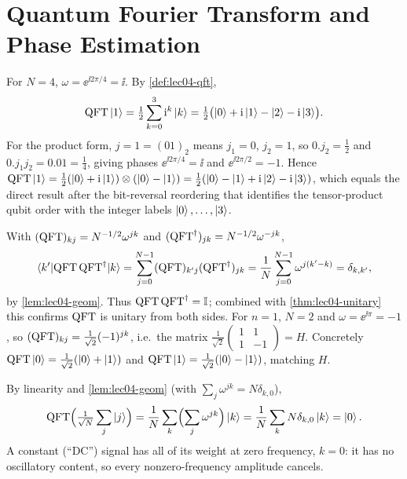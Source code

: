 \chapter{Quantum Fourier Transform and Phase Estimation}

\begin{solution}
For $N=4$, $\omega=\ee^{\ii 2\pi/4}=\ii$. By \cref{def:lec04-qft},
\[
  \mathrm{QFT}\ket{1}=\tfrac12\sum_{k=0}^{3}\mathrm{i}^{k}\ket{k}
   =\tfrac12\bigl(\ket{0}+\mathrm{i}\ket{1}-\ket{2}-\mathrm{i}\ket{3}\bigr).
\]
For the product form, $j=1=(01)_2$ means $j_1=0$, $j_2=1$, so $0.j_2=\tfrac12$
and $0.j_1 j_2=0.01=\tfrac14$, giving phases $\ee^{\ii 2\pi/4}=\ii$ and
$\ee^{\ii 2\pi/2}=-1$. Hence
$\mathrm{QFT}\ket{1}=\tfrac12(\ket{0}+\mathrm{i}\ket{1})\otimes(\ket{0}-\ket{1})
=\tfrac12(\ket{0}-\ket{1}+\mathrm{i}\ket{2}-\mathrm{i}\ket{3})$, which equals the direct
result after the bit-reversal reordering that identifies the tensor-product qubit
order with the integer labels $\ket{0},\dots,\ket{3}$.
\end{solution}

\begin{solution}
With $(\mathrm{QFT})_{kj}=N^{-1/2}\omega^{jk}$ and $(\mathrm{QFT}^{\dagger})_{jk}=N^{-1/2}\omega^{-jk}$,
\[
  \braket{k'|\mathrm{QFT}\,\mathrm{QFT}^{\dagger}|k}
   =\sum_{j=0}^{N-1}(\mathrm{QFT})_{k'j}(\mathrm{QFT}^{\dagger})_{jk}
   =\frac{1}{N}\sum_{j=0}^{N-1}\omega^{j(k'-k)}
   =\delta_{k,k'},
\]
by \cref{lem:lec04-geom}. Thus $\mathrm{QFT}\,\mathrm{QFT}^{\dagger}=\mathbb{I}$; combined with
\cref{thm:lec04-unitary} this confirms $\mathrm{QFT}$ is unitary from both sides. For
$n=1$, $N=2$ and $\omega=\ee^{\ii\pi}=-1$, so $(\mathrm{QFT})_{kj}=\tfrac{1}{\sqrt2}
(-1)^{jk}$, i.e.\ the matrix $\tfrac{1}{\sqrt2}\left(\begin{smallmatrix}1&1\\1&-1
\end{smallmatrix}\right)=H$. Concretely $\mathrm{QFT}\ket{0}=\tfrac{1}{\sqrt2}(\ket0+\ket1)$
and $\mathrm{QFT}\ket{1}=\tfrac{1}{\sqrt2}(\ket0-\ket1)$, matching $H$.
\end{solution}

\begin{solution}
By linearity and \cref{lem:lec04-geom} (with $\sum_j\omega^{jk}=N\delta_{k,0}$),
\[
  \mathrm{QFT}\Bigl(\tfrac{1}{\sqrt N}\sum_{j}\ket{j}\Bigr)
   =\frac{1}{N}\sum_{k}\Bigl(\sum_{j}\omega^{jk}\Bigr)\ket{k}
   =\frac{1}{N}\sum_{k}N\delta_{k,0}\ket{k}=\ket{0}.
\]
A constant (``DC'') signal has all of its weight at zero frequency, $k=0$: it has
no oscillatory content, so every nonzero-frequency amplitude cancels.
\end{solution}

